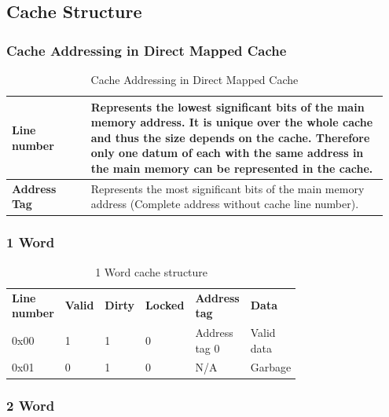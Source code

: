 	\subsection{Cache Structure }
		\subsubsection{Cache Addressing in Direct Mapped Cache}
			\begin{table}[H]
				\centering
				\begin{tabular}{|p{0.2\linewidth}|p{0.75\linewidth}|}
					\hline
					\textbf{Line number}
						& Represents the lowest significant bits of the main memory address. It is unique over the whole cache and thus the size depends on the cache. Therefore only one datum of each with the same address in the main memory can be represented in the cache.\\
					\hline
					\textbf{Address Tag}
						& Represents the most significant bits of the main memory address (Complete address without cache line number).\\
					\hline
				\end{tabular}
				\caption{Cache Addressing in Direct Mapped Cache}
			\end{table} 
			
		\subsubsection {1 Word}
		
			\begin{table}[H]
				\centering
				\begin{tabular}{p{0.15\linewidth}|p{0.06\linewidth}|p{0.06\linewidth}|p{0.06\linewidth}|p{0.2\linewidth}|p{0.2\linewidth}|}
					\cline{2-6}
						\textbf{Line number}
							& \textbf{Valid}
							& \textbf{Dirty}
							& \textbf{Locked}
							& \textbf{Address tag}
							& \textbf{Data}\\
					\cline{2-6}
						0x00
							& 1
							& 1
							& 0
							& Address tag 0
							& Valid data\\
					\cline{2-6}
						0x01
							& 0
							& 1
							& 0
							& N/A
							& Garbage\\
					\cline{2-6}
				\end{tabular}
				\caption{1 Word cache structure}
			\end{table}	
			
		\subsubsection {2 Word}
		
